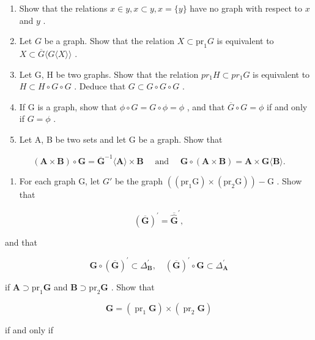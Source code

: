 \exercisegroup

\begin{enumerate}
\def\labelenumi{\arabic{enumi}.}
\item
  Show that the relations \(x \in y, x \subset y, x = \{y\}\) have no graph with respect to \(x\) and \(y\) .
\item
  Let \(G\) be a graph. Show that the relation \(X \subset \mathrm{pr}_1 G\) is equivalent to \(X \subset \overline{G} \langle G \langle X \rangle \rangle\) .
\item
  Let G, H be two graphs. Show that the relation \(pr_{1}H \subset pr_{1}G\) is equivalent to \(H \subset H \circ G \circ G\) . Deduce that \(G \subset G \circ G \circ G\) .
\item
  If G is a graph, show that \(\phi \circ G = G \circ \phi = \phi\) , and that \(\overline{G} \circ G = \phi\) if and only if \(G = \phi\) .
\item
  Let A, B be two sets and let G be a graph. Show that
\end{enumerate}

\[
(\mathbf {A} \times \mathbf {B}) \circ \mathbf {G} = \overline {{\mathbf {G}}} ^ {- 1} \langle \mathbf {A} \rangle \times \mathbf {B} \quad \text { and } \quad \mathbf {G} \circ (\mathbf {A} \times \mathbf {B}) = \mathbf {A} \times \mathbf {G} \langle \mathbf {B} \rangle .
\]

\begin{enumerate}
\def\labelenumi{\arabic{enumi}.}
\setcounter{enumi}{5}
\tightlist
\item
  For each graph G, let \(G'\) be the graph \(((\mathrm{pr}_{1}\mathrm{G}) \times (\mathrm{pr}_{2}\mathrm{G})) - \mathrm{G}\) . Show that
\end{enumerate}

\[
(\overline {{\mathbf {G}}}) ^ {\prime} = \overline {{\widehat {\mathbf {G}}}} ^ {\prime},
\]

and that

\[
\mathbf {G} \circ (\overline {{\mathbf {G}}}) ^ {\prime} \subset \Delta_ {\mathbf {B}} ^ {\prime}, \quad (\overline {{\mathbf {G}}}) ^ {\prime} \circ \mathbf {G} \subset \Delta_ {\mathbf {A}} ^ {\prime}
\]

if \(\mathbf{A} \supset \mathrm{pr}_1\mathbf{G}\) and \(\mathbf{B} \supset \mathrm{pr}_2\mathbf{G}\) . Show that

\[
\mathbf {G} = \left(\operatorname{pr} _ {1} \mathbf {G}\right) \times \left(\operatorname{pr} _ {2} \mathbf {G}\right)
\]

if and only if

